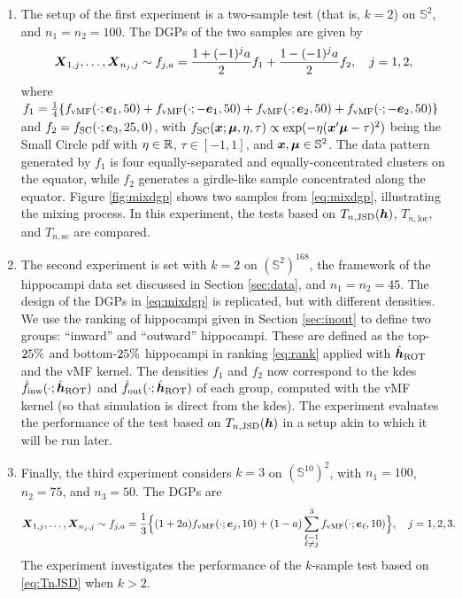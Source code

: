 \documentclass[oneside,11pt]{article}
\begin{document}
\begin{enumerate}[label=\textbf{E\arabic{*}},ref=\textbf{E\arabic{*}}]
    \item The setup of the first experiment is a two-sample test (that is, $k=2$) on $\mathbb{S}^2$, and $n_1=n_2=100$. The DGPs of the two samples are given by
    \begin{align}
        \boldsymbol{X}_{1,j},\ldots,\boldsymbol{X}_{n_j,j}\sim f_{j,a} = \frac{1 + (-1)^j a}{2} f_1 + \frac{1 - (-1)^j a}{2} f_2,\quad j=1,2, \label{eq:mixdgp}
    \end{align}
    where $f_1=\frac{1}{4} \{f_\mathrm{vMF}(\cdot;\boldsymbol{e}_1,50)+f_\mathrm{vMF}(\cdot;-\boldsymbol{e}_1,50)+f_\mathrm{vMF}(\cdot;\boldsymbol{e}_2,50)+\allowbreak f_\mathrm{vMF}(\cdot;-\boldsymbol{e}_2,50)\}$ and $f_2=f_\mathrm{SC}(\cdot;\boldsymbol{e}_3,25,0)$, with $f_\mathrm{SC}(\boldsymbol{x};\boldsymbol\mu,\eta,\tau)\propto \exp(-\eta(\boldsymbol{x}'\boldsymbol\mu-\tau)^2)$ being the Small Circle pdf with $\eta\in\mathbb{R}$, $\tau\in[-1,1]$, and $\boldsymbol{x},\boldsymbol\mu\in\mathbb{S}^2$. The data pattern generated by $f_1$ is four equally-separated and equally-concentrated clusters on the equator, while $f_2$ generates a girdle-like sample concentrated along the equator. Figure \ref{fig:mixdgp} shows two samples from \eqref{eq:mixdgp}, illustrating the mixing process. In this experiment, the tests based on $T_{n,\mathrm{JSD}}({\boldsymbol{h}})$, $T_{n,\mathrm{loc}}$, and $T_{n,\mathrm{sc}}$ are compared. \label{E1}

    \item The second experiment is set with $k=2$ on $(\mathbb{S}^2)^{168}$, the framework of the hippocampi data set discussed in Section \ref{sec:data}, and $n_1=n_2=45$. The design of the DGPs in \eqref{eq:mixdgp} is replicated, but with different densities. We use the ranking of hippocampi given in Section \ref{sec:inout} to define two groups: ``inward'' and ``outward'' hippocampi. These are defined as the top-$25\%$ and bottom-$25\%$ hippocampi in ranking \eqref{eq:rank} applied with $\hat{{\boldsymbol{h}}}_\mathrm{ROT}$ and the vMF kernel. The densities $f_1$ and $f_2$ now correspond to the kdes $\hat{f}_\mathrm{inw}(\cdot;\hat{{\boldsymbol{h}}}_\mathrm{ROT})$ and $\hat{f}_\mathrm{out}(\cdot;\hat{{\boldsymbol{h}}}_\mathrm{ROT})$ of each group, computed with the vMF kernel (so that simulation is direct from the kdes). The experiment evaluates the performance of the test based on $T_{n,\mathrm{JSD}}({\boldsymbol{h}})$ in a setup akin to which it will be run later.\label{E2}

    \item Finally, the third experiment considers $k=3$ on $(\mathbb{S}^{10})^2$, with $n_1=100$, $n_2=75$, and $n_3=50$. The DGPs are
    \begin{align*}
    	\boldsymbol{X}_{1,j},\ldots,\boldsymbol{X}_{n_j,j}&\sim f_{j,a} = \frac{1}{3}\Big\{(1 + 2a) f_\mathrm{vMF}(\cdot;\boldsymbol{e}_j,10) + (1 - a)\sum_{\substack{\ell=1\\\ell \neq j}}^3 f_\mathrm{vMF}(\cdot;\boldsymbol{e}_\ell,10)\Big\},\quad j=1,2,3.
    \end{align*}
    The experiment investigates the performance of the $k$-sample test based on \eqref{eq:TnJSD} when $k>2$. \label{E3}
\end{enumerate}
\end{document}
